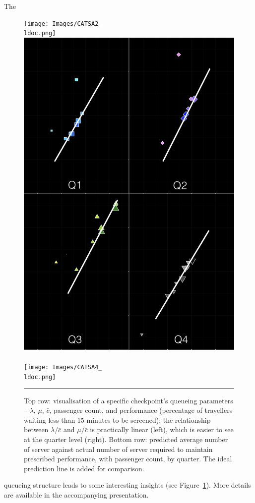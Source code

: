 The \begin{figure}[!t]
\centering
\texttt{[image: Images/CATSA2\_\\ldoc.png]}\quad \includegraphics[height=0.3\textheight]{Images/CATSA3.png} \\  \ \\ 
\texttt{[image: Images/CATSA4\_\\ldoc.png]}  
\caption{\small Top row: visualisation of a specific checkpoint's queueing parameters -- $\lambda$, $\mu$, $\bar{c}$, passenger count, and performance (percentage of travellers waiting less than 15 minutes to be screened); the relationship between $\lambda/\bar{c}$ and $\mu/\bar{c}$ is practically linear (left), which is easier to see at the quarter level (right). Bottom row: predicted average number of server against actual number of server required to maintain prescribed performance, with passenger count, by quarter. The ideal prediction line is added for comparison.}\label{fig:checkpoint}\hrule
\end{figure} queueing structure leads to some interesting insights  (see Figure~\ref{fig:checkpoint}). More details are available in the accompanying presentation. 